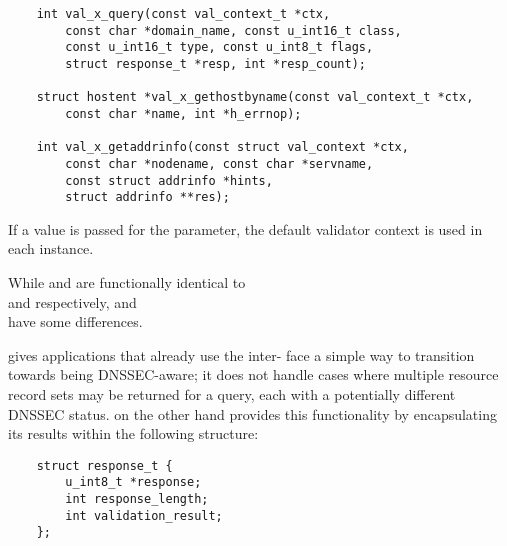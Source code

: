 \begin{verbatim}
    int val_x_query(const val_context_t *ctx,
        const char *domain_name, const u_int16_t class,
        const u_int16_t type, const u_int8_t flags,
        struct response_t *resp, int *resp_count);
                                                                                                                             
    struct hostent *val_x_gethostbyname(const val_context_t *ctx,
        const char *name, int *h_errnop);
                                                                                                                             
    int val_x_getaddrinfo(const struct val_context *ctx,
        const char *nodename, const char *servname,
        const struct addrinfo *hints,
        struct addrinfo **res);
\end{verbatim}                                                                                                                             
                                                                                                                             
If a  value is passed for the  parameter, the default validator
context is used in each instance.
                                                                                                                             
While  and  are 
functionally identical to \\
  and   respectively,
  and \\
 have some differences. 

 gives applications that already use the  inter-
face a simple way to transition towards being DNSSEC-aware; it does
not handle cases where multiple resource record sets may be
returned for a query, each with a potentially different DNSSEC status.
 on the other hand provides this functionality by 
encapsulating its results within the following structure:

\begin{verbatim}
    struct response_t {
        u_int8_t *response;
        int response_length;
        int validation_result;
    };
\end{verbatim}
                                                                                                                             
